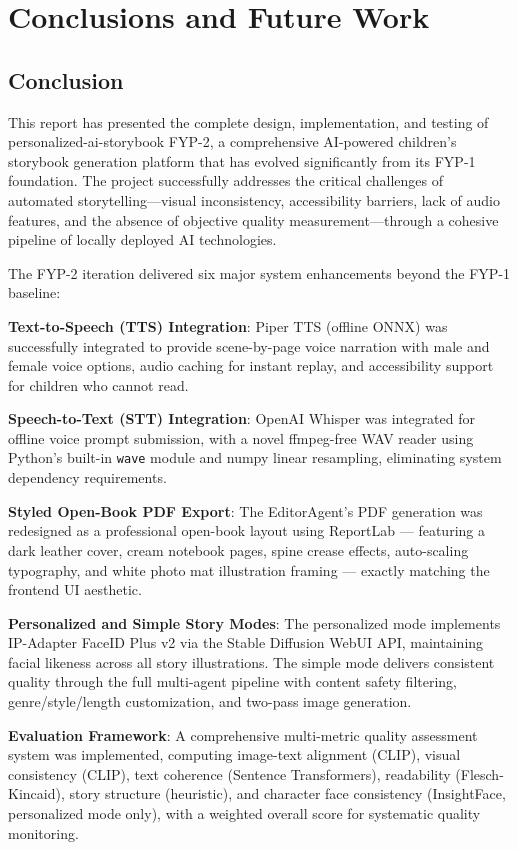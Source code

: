 \chapter{Conclusions and Future Work}

\section{Conclusion}

This report has presented the complete design, implementation, and testing of personalized-ai-storybook FYP-2, a comprehensive AI-powered children's storybook generation platform that has evolved significantly from its FYP-1 foundation. The project successfully addresses the critical challenges of automated storytelling—visual inconsistency, accessibility barriers, lack of audio features, and the absence of objective quality measurement—through a cohesive pipeline of locally deployed AI technologies.

The FYP-2 iteration delivered six major system enhancements beyond the FYP-1 baseline:

\textbf{Text-to-Speech (TTS) Integration}: Piper TTS (offline ONNX) was successfully integrated to provide scene-by-page voice narration with male and female voice options, audio caching for instant replay, and accessibility support for children who cannot read.

\textbf{Speech-to-Text (STT) Integration}: OpenAI Whisper was integrated for offline voice prompt submission, with a novel ffmpeg-free WAV reader using Python's built-in \texttt{wave} module and numpy linear resampling, eliminating system dependency requirements.

\textbf{Styled Open-Book PDF Export}: The EditorAgent's PDF generation was redesigned as a professional open-book layout using ReportLab — featuring a dark leather cover, cream notebook pages, spine crease effects, auto-scaling typography, and white photo mat illustration framing — exactly matching the frontend UI aesthetic.

\textbf{Personalized and Simple Story Modes}: The personalized mode implements IP-Adapter FaceID Plus v2 via the Stable Diffusion WebUI API, maintaining facial likeness across all story illustrations. The simple mode delivers consistent quality through the full multi-agent pipeline with content safety filtering, genre/style/length customization, and two-pass image generation.

\textbf{Evaluation Framework}: A comprehensive multi-metric quality assessment system was implemented, computing image-text alignment (CLIP), visual consistency (CLIP), text coherence (Sentence Transformers), readability (Flesch-Kincaid), story structure (heuristic), and character face consistency (InsightFace, personalized mode only), with a weighted overall score for systematic quality monitoring.

